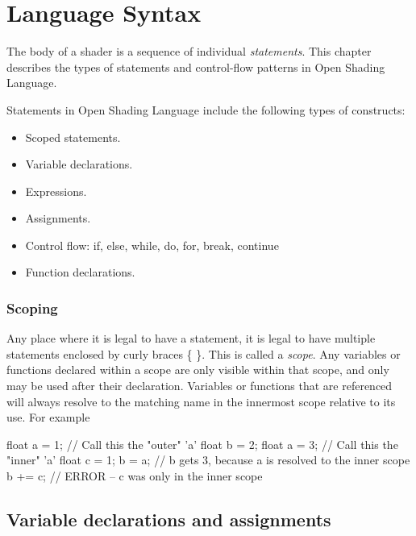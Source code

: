 \documentclass[11pt,letterpaper]{book}
\def\langname{Open Shading Language\xspace}
\begin{document}
\medskip




\chapter{Language Syntax}
\label{chap:syntax}

The body of a shader is a sequence of individual \emph{statements}.
This chapter describes the types of statements and control-flow patterns
in \langname.

Statements in \langname include the following types of constructs:

\begin{itemize}
\item Scoped statements.
\item Variable declarations.
\item Expressions.
\item Assignments.
\item Control flow: {\cf if, else, while, do, for, break, continue}
\item Function declarations.
\end{itemize}

\subsection*{Scoping}

Any place where it is legal to have a statement, it is legal to have
multiple statements enclosed by curly braces {\cf \{ \}}.  This is
called a \emph{scope}.  Any variables or functions declared
within a scope are only visible within that scope, and only may be used
after their declaration.  Variables or functions that are referenced
will always resolve to the matching name in the innermost scope relative
to its use.  For example

\begin{code}
    float a = 1;      // Call this the "outer" 'a'
    float b = 2;
    {
        float a = 3;  // Call this the "inner" 'a'
        float c = 1;
        b = a;        // b gets 3, because a is resolved to the inner scope
    }
    b += c;           // ERROR -- c was only in the inner scope

\end{code}



\section{Variable declarations and assignments}
\label{sec:vardeclsassignments}
\end{document}
